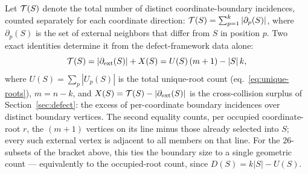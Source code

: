 \begin{remark}\label{rem:coord-edges}
Let $\mathcal{T}(S)$ denote the total number of distinct coordinate-boundary
incidences, counted separately for each coordinate direction:
$\mathcal{T}(S) = \sum_{p=1}^{k} |\partial_p(S)|$, where $\partial_p(S)$ is the
set of external neighbors that differ from $S$ in position $p$.  Two exact
identities determine it from the defect-framework data alone:
\begin{equation}\label{eq:coord-edges}
	\mathcal{T}(S) = |\partial_{\mathrm{ext}}(S)| + X(S) = U(S)\,(m+1) - |S|\,k,
\end{equation}
where $U(S) = \sum_p |U_p(S)|$ is the total unique-root count
(eq.~\eqref{eq:unique-roots}), $m = n-k$, and
$X(S) = \mathcal{T}(S) - |\partial_{\mathrm{ext}}(S)|$ is the cross-collision surplus of
Section~\ref{sec:defect}: the excess of per-coordinate boundary incidences over
distinct boundary vertices.  The second equality counts, per occupied
coordinate-root $r$, the $(m+1)$ vertices on its line minus those already
selected into $S$; every such external vertex is adjacent to all members on
that line.
For the $26$-subsets of the bracket above, this ties the boundary size to a
single geometric count --- equivalently to the occupied-root count, since
$D(S) = k|S| - U(S)$.
\end{remark}
